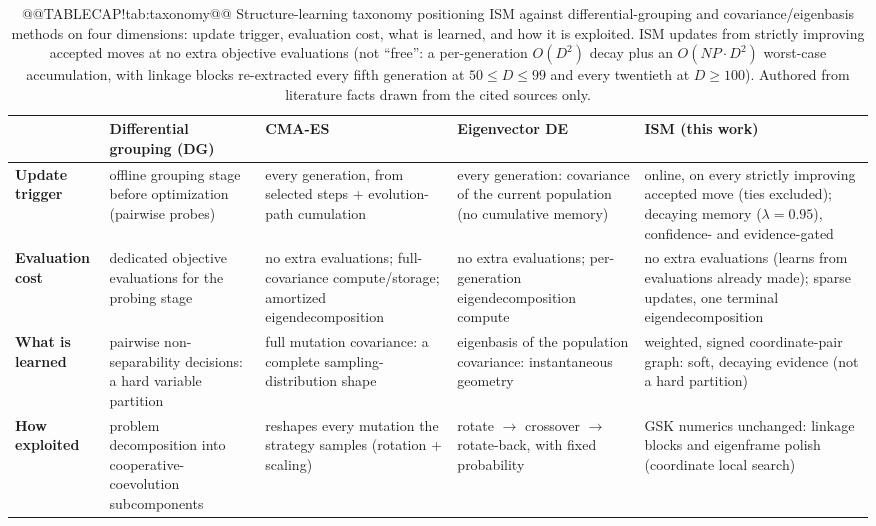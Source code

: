 \documentclass[10pt,a4paper]{article}
\begin{document}
\begin{table}[H]
\caption{@@TABLECAP!tab:taxonomy@@ Structure-learning taxonomy positioning ISM against
differential-grouping and covariance/eigenbasis methods on four
dimensions: update trigger, evaluation cost, what is learned, and how it
is exploited. ISM updates from strictly improving accepted moves at no extra objective
evaluations (not ``free'': a per-generation $O(D^{2})$ decay plus an
$O(\mathit{NP} \cdot D^{2})$ worst-case accumulation, with linkage blocks
re-extracted every fifth generation at $50 \le D \le 99$ and every
twentieth at $D \ge 100$). Authored from literature facts drawn from the cited sources
only.}
\label{tab:taxonomy}
\scriptsize
\zebra
\begin{tabular}{p{1.45cm}p{2.85cm}p{2.85cm}p{2.85cm}p{2.85cm}}
\toprule
& \textbf{Differential grouping (DG)} & \textbf{CMA-ES} & \textbf{Eigenvector DE} & \textbf{ISM (this work)} \\
\midrule
\textbf{Update trigger} & offline grouping stage before optimization (pairwise probes) & every generation, from selected steps + evolution-path cumulation & every generation: covariance of the current population (no cumulative memory) & online, on every strictly improving accepted move (ties excluded); decaying memory ($\lambda{=}0.95$), confidence- and evidence-gated \\
\textbf{Evaluation cost} & dedicated objective evaluations for the probing stage & no extra evaluations; full-covariance compute/storage; amortized eigendecomposition & no extra evaluations; per-generation eigendecomposition compute & no extra evaluations (learns from evaluations already made); sparse updates, one terminal eigendecomposition \\
\textbf{What is learned} & pairwise non-separability decisions: a hard variable partition & full mutation covariance: a complete sampling-distribution shape & eigenbasis of the population covariance: instantaneous geometry & weighted, signed coordinate-pair graph: soft, decaying evidence (not a hard partition) \\
\textbf{How exploited} & problem decomposition into cooperative-\allowbreak{}coevolution subcomponents & reshapes every mutation the strategy samples (rotation + scaling) & rotate $\to$ crossover $\to$ rotate-back, with fixed probability & GSK numerics unchanged: linkage blocks and eigenframe polish (coordinate local search) \\
\bottomrule
\end{tabular}
 
\end{table}
\end{document}
